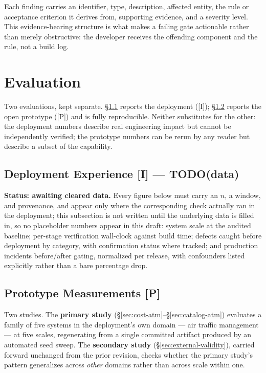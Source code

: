 \documentclass[sigconf,9pt]{acmart}
\begin{document}
Each finding carries an identifier, type, description, affected entity, the rule or acceptance
criterion it derives from, supporting evidence, and a severity level. This evidence-bearing
structure is what makes a failing gate actionable rather than merely obstructive: the developer
receives the offending component and the rule, not a build log.

\section{Evaluation}
\label{sec:evaluation}

Two evaluations, kept separate. \S\ref{sec:deployment} reports the deployment ([I]);
\S\ref{sec:prototype} reports the open prototype ([P]) and is fully reproducible. Neither
substitutes for the other: the deployment numbers describe real engineering impact but cannot be
independently verified; the prototype numbers can be rerun by any reader but describe a subset of
the capability.

\subsection{Deployment Experience [I] --- TODO(data)}
\label{sec:deployment}

\textbf{Status: awaiting cleared data.} Every figure below must carry an $n$, a window, and
provenance, and appear only where the corresponding check actually ran in the deployment; this
subsection is not written until the underlying data is filled in, so no placeholder numbers appear
in this draft: system scale at the audited baseline; per-stage verification wall-clock against
build time; defects caught before deployment by category, with confirmation status where tracked;
and production incidents before/after gating, normalized per release, with confounders listed
explicitly rather than a bare percentage drop.

\subsection{Prototype Measurements [P]}
\label{sec:prototype}

Two studies. The \textbf{primary study} (\S\ref{sec:cost-atm}--\S\ref{sec:catalog-atm}) evaluates a
family of five systems in the deployment's own domain --- air traffic management --- at five scales,
regenerating from a single committed artifact produced by an automated seed sweep. The
\textbf{secondary study} (\S\ref{sec:external-validity}), carried forward unchanged from the prior
revision, checks whether the primary study's pattern generalizes across \emph{other} domains
rather than across scale within one.
\end{document}
